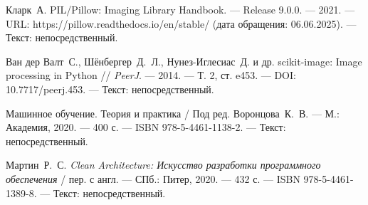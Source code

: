\begin{thebibliography}{99}
	 Кларк~А. PIL/Pillow: Imaging Library Handbook. — Release 9.0.0. — 2021. — URL: https://pillow.readthedocs.io/en/stable/ (дата обращения: 06.06.2025). — Текст: непосредственный.
	
	 Ван дер Валт~С., Шёнбергер~Д.~Л., Нунез-Иглесиас~Д. и др. scikit-image: Image processing in Python // \emph{PeerJ}. — 2014. — Т. 2, ст. e453. — DOI: 10.7717/peerj.453. — Текст: непосредственный.
	
	 Машинное обучение. Теория и практика / Под ред. Воронцова~К.~В. — М.: Академия, 2020. — 400 с. — ISBN 978-5-4461-1138-2. — Текст: непосредственный.
	
	 Мартин~Р.~С. \emph{Clean Architecture: Искусство разработки программного обеспечения} / пер. с англ. — СПб.: Питер, 2020. — 432 с. — ISBN 978-5-4461-1389-8. — Текст: непосредственный.
	
\end{thebibliography}